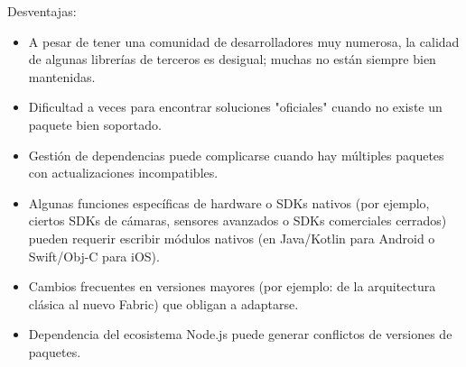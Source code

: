 Desventajas:
\begin{itemize}
    \item A pesar de tener una comunidad de desarrolladores muy numerosa, la calidad de algunas librerías de terceros es desigual; muchas no están siempre bien mantenidas.
    \item Dificultad a veces para encontrar soluciones "oficiales" cuando no existe un paquete bien soportado.
    \item Gestión de dependencias puede complicarse cuando hay múltiples paquetes con actualizaciones incompatibles.
    \item Algunas funciones específicas de hardware o SDKs nativos (por ejemplo, ciertos SDKs de cámaras, sensores avanzados o SDKs comerciales cerrados) pueden requerir escribir módulos nativos (en Java/Kotlin para Android o Swift/Obj-C para iOS).
    \item Cambios frecuentes en versiones mayores (por ejemplo: de la arquitectura clásica al nuevo Fabric) que obligan a adaptarse.
    \item Dependencia del ecosistema Node.js puede generar conflictos de versiones de paquetes.
\end{itemize}


